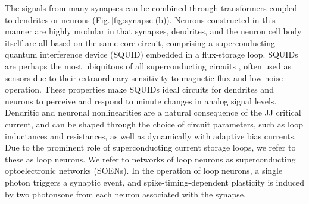 \documentclass[twocolumn]{article}
\begin{document}
The signals from many synapses can be combined through transformers coupled to dendrites or neurons (Fig.\,\ref{fig:synapse}(b)). Neurons constructed in this manner are highly modular in that synapses, dendrites, and the neuron cell body itself are all based on the same core circuit, comprising a superconducting quantum interference device (SQUID) embedded in a flux-storage loop. SQUIDs are perhaps the most ubiquitous of all superconducting circuits \cite{vatu1998,ka1999}, often used as sensors due to their extraordinary sensitivity to magnetic flux and low-noise operation. These properties make SQUIDs ideal circuits for dendrites and neurons to perceive and respond to minute changes in analog signal levels. Dendritic and neuronal nonlinearities are a natural consequence of the JJ critical current, and can be shaped through the choice of circuit parameters, such as loop inductances and resistances, as well as dynamically with adaptive bias currents. Due to the prominent role of superconducting current storage loops, we refer to these as loop neurons. We refer to networks of loop neurons as superconducting optoelectronic networks (SOENs). In the operation of loop neurons, a single photon triggers a synaptic event, and spike-timing-dependent plasticity is induced by two photons\textemdash one from each neuron associated with the synapse.
\begin{figure}
\end{figure}
\end{document}
